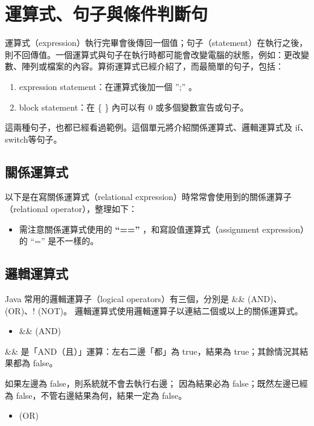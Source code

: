 \documentclass[a4paper,12pt,english]{sphinxmanual}
\begin{document}
\chapter{運算式、句子與條件判斷句}
\label{java_cond::doc}\label{java_cond:id1}
運算式（expression）執行完畢會後傳回一個值；句子（statement）在執行之後，則不回傳值。一個運算式與句子在執行時都可能會改變電腦的狀態，例如：更改變數、陣列或檔案的內容。算術運算式已經介紹了，而最簡單的句子，包括：
\begin{enumerate}
\item {} 
expression statement：在運算式後加一個 '';'' 。

\item {} 
block statement：在 \{ \} 內可以有 0 或多個變數宣告或句子。

\end{enumerate}

這兩種句子，也都已經看過範例。這個單元將介紹關係運算式、邏輯運算式及 if、switch等句子。


\section{關係運算式}
\label{java_cond:id2}
以下是在寫關係運算式（relational expression）時常常會使用到的關係運算子（relational operator），整理如下：
\begin{itemize}
\item {} 
需注意關係運算式使用的  \textbf{``==''}  ，和寫設值運算式（assignment expression）的 ``='' 是不一樣的。

\end{itemize}


\section{邏輯運算式}
\label{java_cond:id3}
Java 常用的邏輯運算子（logical operators）有三個，分別是 \&\& (AND)、\textbar{}\textbar{} (OR)、! (NOT)。
邏輯運算式使用邏輯運算子以連結二個或以上的關係運算式。
\begin{itemize}
\item {} 
\&\& (AND)

\end{itemize}

\&\& 是「AND（且）」運算：左右二邊「都」為 true，結果為 true；其餘情況其結果都為 false。

如果左邊為 false，則系統就不會去執行右邊；
因為結果必為 false；既然左邊已經為 false，不管右邊結果為何，結果一定為 false。
\begin{itemize}
\item {} 
\textbar{}\textbar{} (OR)

\end{itemize}
\end{document}
